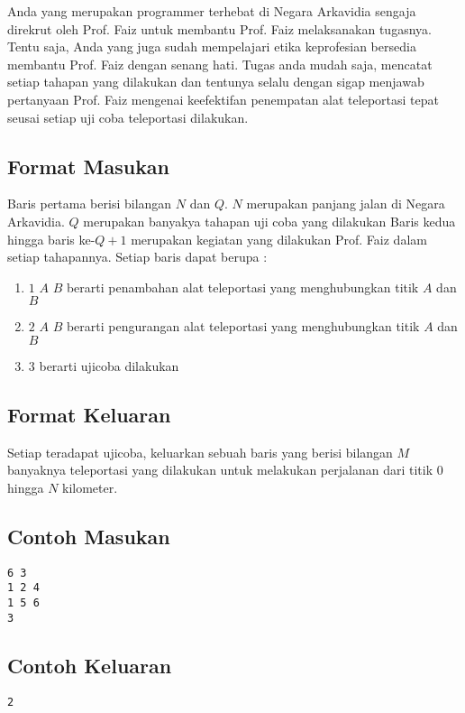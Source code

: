 \documentclass{article}
\begin{document}
Anda yang merupakan programmer terhebat di Negara Arkavidia sengaja direkrut oleh Prof. Faiz untuk membantu Prof. Faiz melaksanakan tugasnya. Tentu saja, Anda yang juga sudah mempelajari etika keprofesian bersedia membantu Prof. Faiz dengan senang hati. Tugas anda mudah saja, mencatat setiap tahapan yang dilakukan dan tentunya selalu dengan sigap menjawab pertanyaan Prof. Faiz mengenai keefektifan penempatan alat teleportasi tepat seusai setiap uji coba teleportasi dilakukan.

\subsection*{Format Masukan}
Baris pertama berisi bilangan $N$ dan $Q$. $N$ merupakan panjang jalan di Negara Arkavidia. $Q$ merupakan banyakya tahapan uji coba yang dilakukan
Baris kedua hingga baris ke-$Q+1$ merupakan kegiatan yang dilakukan Prof. Faiz dalam setiap tahapannya.
Setiap baris dapat berupa :
\begin{enumerate}
    \setlength\itemsep{0pt}
    \item $1$ $A$ $B$ berarti penambahan alat teleportasi yang menghubungkan titik $A$ dan $B$
    \item $2$ $A$ $B$ berarti pengurangan alat teleportasi yang menghubungkan titik $A$ dan $B$
    \item $3$ berarti ujicoba dilakukan    
\end{enumerate}


\subsection*{Format Keluaran}
Setiap teradapat ujicoba, keluarkan sebuah baris yang berisi bilangan $M$ banyaknya teleportasi yang dilakukan untuk melakukan perjalanan dari titik $0$ hingga $N$ kilometer. 
\\

\begin{multicols}{2}
\subsection*{Contoh Masukan}
\begin{lstlisting}
6 3
1 2 4
1 5 6
3
\end{lstlisting}
\columnbreak
\subsection*{Contoh Keluaran}
\begin{lstlisting}
2
\end{lstlisting}
\vfill
\null
\end{multicols}
\end{document}
